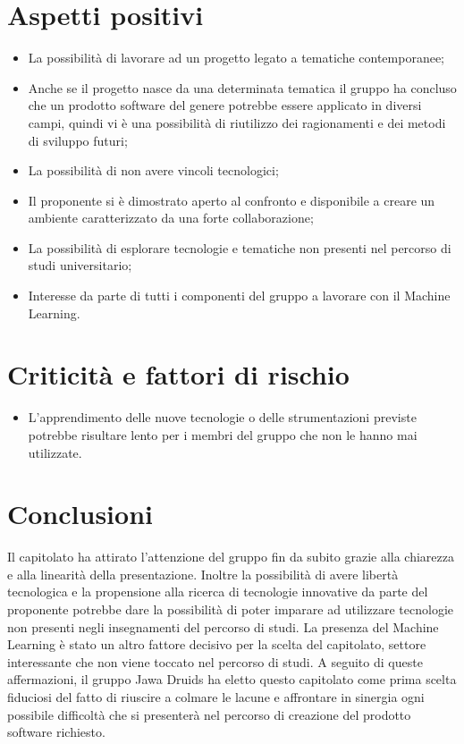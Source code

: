 \section{Aspetti positivi}
\begin{itemize}
	\item La possibilità di lavorare ad un progetto legato a tematiche contemporanee;
	\item Anche se il progetto nasce da una determinata tematica il gruppo ha concluso che un prodotto software del genere potrebbe essere applicato in diversi campi, quindi vi è una possibilità di riutilizzo dei ragionamenti e dei metodi di sviluppo futuri;
	\item La possibilità di non avere vincoli tecnologici;
	\item Il proponente si è dimostrato aperto al confronto e disponibile a creare un ambiente caratterizzato da una forte collaborazione;
	\item La possibilità di esplorare tecnologie e tematiche non presenti nel percorso di studi universitario;
	\item Interesse da parte di tutti i componenti del gruppo a lavorare con il Machine Learning.
\end{itemize}
\section{Criticità e fattori di rischio}
\begin{itemize}
	\item L'apprendimento delle nuove tecnologie o delle strumentazioni previste potrebbe risultare lento per i membri del gruppo che non le hanno mai utilizzate.
\end{itemize}
\section{Conclusioni}
Il capitolato ha attirato l'attenzione del gruppo fin da subito grazie alla chiarezza e alla linearità della presentazione. Inoltre la possibilità di avere libertà tecnologica e la propensione alla ricerca di tecnologie innovative da parte del proponente potrebbe dare la possibilità di poter imparare ad utilizzare tecnologie non presenti negli insegnamenti del percorso di studi. La presenza del Machine Learning è stato un altro fattore decisivo per la scelta del capitolato, settore interessante che non viene toccato nel percorso di studi. A seguito di queste affermazioni, il gruppo Jawa Druids ha eletto questo capitolato come prima scelta fiduciosi del fatto di riuscire a colmare le lacune e affrontare in sinergia ogni possibile difficoltà che si presenterà nel percorso di creazione del prodotto software richiesto.